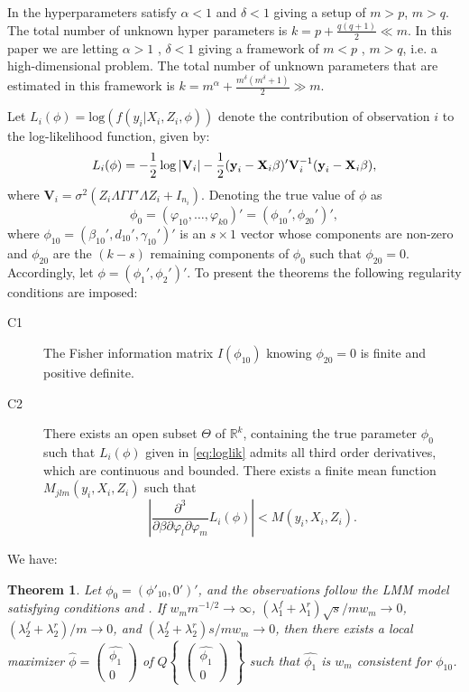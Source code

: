 \documentclass{article}
\newtheorem{thm}{Theorem}
\begin{document}
In \cite{BKG2010} the hyperparameters satisfy $\alpha < 1$ and $\delta < 1$ giving a setup of $m>p$, $m>q$. The total number of unknown hyper parameters is $k=p+\frac{q(q+1)}{2}\ll m$. In this paper we are letting $\alpha > 1$ , $\delta < 1$ giving a framework of $m<p$ , $m>q$, i.e. a high-dimensional problem. The total number of unknown parameters that are estimated in this framework is $k=m^{\alpha}+\frac{m^{\delta}(m^{\delta}+1)}{2}\gg m$.

Let $L_i(\phi)=\text{log}(f(y_i|X_i,Z_i,\phi))$ denote the contribution of observation $i$ to the log-likelihood function, given by:
\begin{equation}
L_i(\phi)= -\frac{1}{2} \mathop{\rm log}|\textbf{V}_i|-\frac{1}{2}(\textbf{y}_i - \textbf{X}_i\beta)'\textbf{V}_i^{-1}(\textbf{y}_i-\textbf{X}_i\beta),
\label{eq:loglik}
\end{equation}
where $\textbf{V}_i=\sigma^2(Z_i\Lambda\Gamma\Gamma'\Lambda Z_i+I_{n_i})$. Denoting the true value of $\phi$ as $$\phi_0=(\varphi_{10},\dots,\varphi_{k0}) '=( \phi_{10}',\phi_{20}')',$$ where $\phi_{10}=(\beta_{10}',d_{10}',\gamma_{10}')'$ is an $s \times 1$ vector whose components are non-zero and $\phi_{20}$ are the $(k-s)$ remaining components of $\phi_0$ such that $\phi_{20}=0$. Accordingly, let $\phi=( \phi_{1}',\phi_{2}')'$.
To present the theorems the following regularity conditions are imposed:
%
\begin{description}
	\item[C1\label{C1}]
		The Fisher information matrix $I(\phi_{10})$ knowing $\phi_{20}=0$ is finite and positive definite.
	\item[C2\label{C2}]
		There exists an open subset $\Theta$ of $\mathbb{R}^k$, containing the true parameter $\phi_0$ such that $L_i(\phi)$ given in \eqref{eq:loglik} admits all third order derivatives, which are continuous and bounded.
		There exists a finite mean function $M_{jlm}(y_i,X_i,Z_i)$ such that $$\left|\frac{\partial^3}{\partial \beta \partial\varphi_l \partial \varphi_m}L_i(\phi)\right|<M(y_i,X_i,Z_i).$$
\end{description}
We have:
\begin{thm}
  \label{thm1}
    Let $\phi_0=(\phi'_{10},0')'$, and the observations follow the LMM model satisfying conditions  and . If  $w_mm^{-1/2}\to\infty$, $(\lambda_1^f+\lambda_1^r)\sqrt s/mw_m\to 0$, $(\lambda_2^f+\lambda_2^r)/m\to 0$, and $(\lambda_2^f+\lambda_2^r)s/mw_m\to 0$, then there exists a local maximizer $\hat{\phi}=\begin{pmatrix}
    \hat{\phi_1} \\ 0 \end{pmatrix}$ of $Q\begin{Bmatrix}\begin{pmatrix}
    \hat{\phi_1} \\ 0 \end{pmatrix}\end{Bmatrix}$ such that $\hat{\phi_1}$ is $w_m$ consistent for $\phi_{10}$.
  \end{thm}
\end{document}

